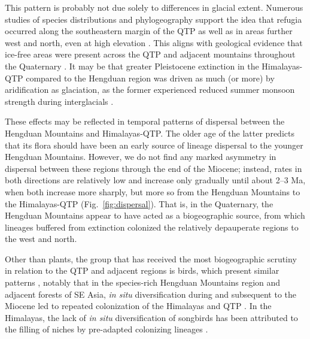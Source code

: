 This pattern is probably not due solely to differences in glacial
extent. Numerous studies of species distributions
\citep[e.g.,][]{srinivasan2014,lopez2011} and phylogeography
\citep[e.g.,][]{CunY2010,WangBS2011,lei2014,meng2015} support the idea
that refugia occurred along the southeastern margin of the QTP as well
as in areas further west and north, even at high elevation
\citep[e.g.,][]{wang2009,sun2010,opgenoorth2010}. This aligns with
geological evidence that ice-free areas were present across the QTP
and adjacent mountains throughout the Quaternary
\citep[see][]{owen2014}. It may be that greater Pleistocene extinction
in the Himalayas-QTP compared to the Hengduan region was driven as
much (or more) by aridification as glaciation, as the former
experienced reduced summer monsoon strength during interglacials
\citep{owen2008}.

These effects may be reflected in temporal patterns of dispersal
between the Hengduan Mountains and Himalayas-QTP. The older age of the
latter predicts that its flora should have been an early source of
lineage dispersal to the younger Hengduan Mountains. However, we do
not find any marked asymmetry in dispersal between these regions
through the end of the Miocene; instead, rates in both directions are
relatively low and increase only gradually until about 2--3 Ma, when
both increase more sharply, but more so from the Hengduan Mountains to
the Himalayas-QTP (Fig.~\ref{fig:dispersal}). That is, in the
Quaternary, the Hengduan Mountains appear to have acted as a
biogeographic source, from which lineages buffered from extinction
colonized the relatively depauperate regions to the west and
north. %




Other than plants, the group that has received the most biogeographic
scrutiny in relation to the QTP and adjacent regions is birds, which
present similar patterns \citep[see][]{packert2015}, notably that in
the species-rich Hengduan Mountains region and adjacent forests of SE
Asia, \textit{in situ} diversification during and subsequent to the
Miocene led to repeated colonization of the Himalayas and QTP
\citep[e.g.,][]{liu2016,tietze2013,johansson2007}. In the Himalayas,
the lack of \textit{in situ} diversification of songbirds has been
attributed to the filling of niches by pre-adapted colonizing lineages
\citep{price2014}.

